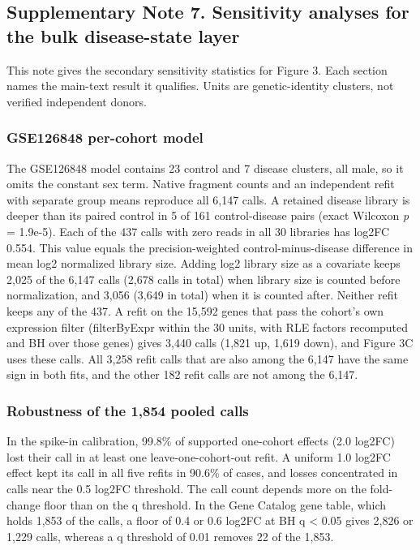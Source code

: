 \subsection{Supplementary Note 7. Sensitivity analyses for the bulk disease-state layer}\label{supplementary-note-7.-sensitivity-analyses-for-the-bulk-disease-state-layer}

This note gives the secondary sensitivity statistics for Figure 3. Each section names the main-text result it qualifies. Units are genetic-identity clusters, not verified independent donors.

\subsubsection{GSE126848 per-cohort model}\label{gse126848-per-cohort-model}

The GSE126848 model contains 23 control and 7 disease clusters, all male, so it omits the constant sex term. Native fragment counts and an independent refit with separate group means reproduce all 6,147 calls. A retained disease library is deeper than its paired control in 5 of 161 control-disease pairs (exact Wilcoxon \emph{p} = 1.9e-5). Each of the 437 calls with zero reads in all 30 libraries has log2FC 0.554. This value equals the precision-weighted control-minus-disease difference in mean log2 normalized library size. Adding log2 library size as a covariate keeps 2,025 of the 6,147 calls (2,678 calls in total) when library size is counted before normalization, and 3,056 (3,649 in total) when it is counted after. Neither refit keeps any of the 437. A refit on the 15,592 genes that pass the cohort's own expression filter (filterByExpr within the 30 units, with RLE factors recomputed and BH over those genes) gives 3,440 calls (1,821 up, 1,619 down), and Figure 3C uses these calls. All 3,258 refit calls that are also among the 6,147 have the same sign in both fits, and the other 182 refit calls are not among the 6,147.

\subsubsection{Robustness of the 1,854 pooled calls}\label{robustness-of-the-1854-pooled-calls}

In the spike-in calibration, 99.8\% of supported one-cohort effects (2.0 log2FC) lost their call in at least one leave-one-cohort-out refit. A uniform 1.0 log2FC effect kept its call in all five refits in 90.6\% of cases, and losses concentrated in calls near the 0.5 log2FC threshold. The call count depends more on the fold-change floor than on the q threshold. In the Gene Catalog gene table, which holds 1,853 of the calls, a floor of 0.4 or 0.6 log2FC at BH q \textless{} 0.05 gives 2,826 or 1,229 calls, whereas a q threshold of 0.01 removes 22 of the 1,853.

